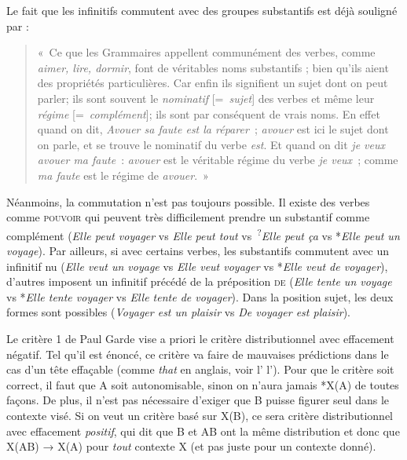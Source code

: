 {     Le fait que les infinitifs commutent avec des groupes substantifs est déjà souligné par \citet[59]{buffier1709grammaire} : 
    \begin{quote}
        «~Ce que les Grammaires appellent communément des verbes, comme \textit{aimer, lire, dormir}, font de véritables noms substantifs ; bien qu’ils aient des propriétés particulières. Car enfin ils signifient un sujet dont on peut parler; ils sont souvent le \textit{nominatif} [=~\textit{sujet}] des verbes et même leur \textit{régime} [=~\textit{complément}]; ils sont par conséquent de vrais noms. En effet quand on dit, \textit{Avouer sa faute est la réparer~}; \textit{avouer} est ici le sujet dont on parle, et se trouve le nominatif du verbe \textit{est}. Et quand on dit \textit{je veux avouer ma faute~}: \textit{avouer} est le véritable régime du verbe \textit{je veux~}; comme \textit{ma faute} est le régime de \textit{avouer}.~»
    \end{quote}

    Néanmoins, la commutation n’est pas toujours possible. Il existe des verbes comme \textsc{pouvoir} qui peuvent très difficilement prendre un substantif comme complément (\textit{Elle peut voyager} vs \textit{Elle peut tout} vs~\textsuperscript{?}\textit{Elle peut ça} vs *\textit{Elle peut un voyage}). Par ailleurs, si avec certains verbes, les substantifs commutent avec un infinitif nu (\textit{Elle veut un voyage} vs \textit{Elle veut voyager} vs *\textit{Elle veut de voyager}), d’autres imposent un infinitif précédé de la préposition \textsc{de} (\textit{Elle tente un voyage} vs *\textit{Elle tente voyager} vs \textit{Elle tente de voyager}). Dans la position sujet, les deux formes sont possibles (\textit{Voyager est un plaisir} vs \textit{De voyager est plaisir}).

     Le critère 1 de Paul Garde vise a priori le critère distributionnel avec effacement négatif. Tel qu'il est énoncé, ce critère va faire de mauvaises prédictions dans le cas d'un tête effaçable (comme \textit{that} en anglais, voir l' l’). Pour que le critère soit correct, il faut que A soit autonomisable, sinon on n'aura jamais *X(A) de toutes façons. De plus, il n'est pas nécessaire d'exiger que B puisse figurer seul dans le contexte visé. Si on veut un critère basé sur X(B), ce sera critère distributionnel avec effacement \textit{positif}, qui dit que B et AB ont la même distribution et donc que X(AB) → X(A) pour \textit{tout} contexte X (et pas juste pour un contexte donné).
    
}

